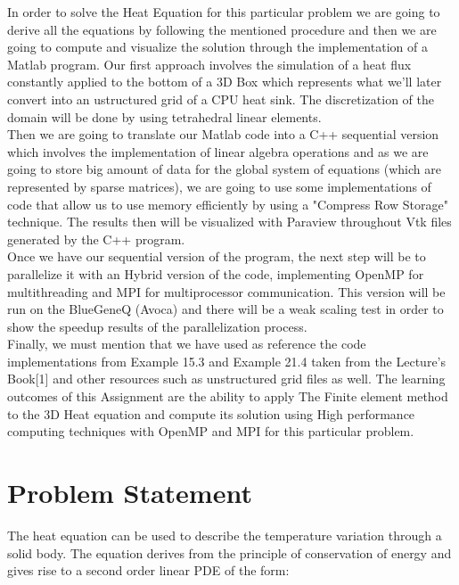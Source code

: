 \documentclass[12pt]{article}
\begin{document}
In order to solve the Heat Equation for this particular problem we are going to derive all the equations by following the mentioned procedure and then we are going to compute and visualize the solution through the implementation of a Matlab program. Our first approach involves the simulation of a heat flux constantly applied to the bottom of a 3D Box which represents what we'll later convert into an ustructured grid of a CPU heat sink. The discretization of the domain will be done by using tetrahedral linear elements. \\

Then we are going to translate our Matlab code into a C++ sequential version which involves the implementation of linear algebra operations and as we are going to store big amount of data for the global system of equations (which are represented by sparse matrices), we are going to use some implementations of code that allow us to use memory efficiently by using a "Compress Row Storage" technique. The results then will be visualized with Paraview throughout Vtk files generated by the C++ program.\\

Once we have our sequential version of the program, the next step will be to parallelize it with an Hybrid version of the code, implementing OpenMP for multithreading and MPI for multiprocessor communication. This version will be run on the BlueGeneQ (Avoca) and there will be a weak scaling test in order to show the speedup results of the parallelization process.\\

Finally, we must mention that we have used as reference the code implementations from Example 15.3 and Example 21.4 taken from the Lecture's Book[1] and other resources such as unstructured grid files as well. The learning outcomes of this Assignment are the ability to apply The Finite element method to the 3D Heat equation and compute its solution using High performance computing techniques with OpenMP and MPI for this particular problem.\\ 
	
	\section{Problem Statement}
	
The heat equation can be used to describe the temperature variation through a
solid body. The equation derives from the principle of conservation of energy
and gives rise to a second order linear PDE of the form:
	
\end{document}
